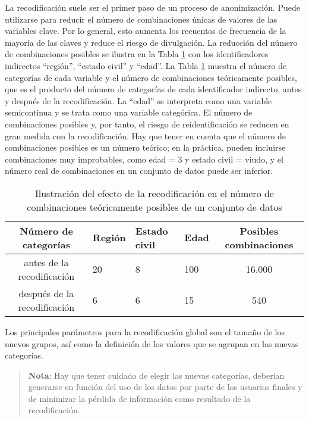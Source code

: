 \documentclass[
]{book}
\theoremstyle{definition}
\theoremstyle{definition}
\theoremstyle{definition}
\theoremstyle{definition}
\theoremstyle{remark}
\begin{document}
La recodificación suele ser el primer paso de un proceso de anonimización. Puede utilizarse para reducir el número de combinaciones únicas de valores de las variables clave. Por lo general, esto aumenta los recuentos de frecuencia de la mayoría de las claves y reduce el riesgo de divulgación. La reducción del número de combinaciones posibles se ilustra en la Tabla \ref{tab:Tabla8} con los identificadores indirectos ``región'', ``estado civil'' y ``edad''. La Tabla \ref{tab:Tabla8} muestra el número de categorías de cada variable y el número de combinaciones teóricamente posibles, que es el producto del número de categorías de cada identificador indirecto, antes y después de la recodificación. La ``edad'' se interpreta como una variable semicontinua y se trata como una variable categórica. El número de combinaciones posibles y, por tanto, el riesgo de reidentificación se reducen en gran medida con la recodificación. Hay que tener en cuenta que el número de combinaciones posibles es un número teórico; en la práctica, pueden incluirse combinaciones muy improbables, como edad = 3 y estado civil = viudo, y el número real de combinaciones en un conjunto de datos puede ser inferior.

\begin{table}

\caption{\label{tab:Tabla8}\label{tab:Tabla8}Ilustración del efecto de la recodificación en el número de combinaciones teóricamente posibles de un conjunto de datos}
\centering
\begin{tabular}[t]{clllc}
\toprule
Número de   categorías & Región & Estado civil & Edad & Posibles   combinaciones\\
\midrule
antes de la recodificación & 20 & 8 & 100 & 16.000\\
después de la recodificación & 6 & 6 & 15 & 540\\
\bottomrule
\end{tabular}
\end{table}

Los principales parámetros para la recodificación global son el tamaño de los nuevos grupos, así como la definición de los valores que se agrupan en las nuevas categorías.

\begin{quote}
\textbf{Nota}: Hay que tener cuidado de elegir las nuevas categorías, deberían generarse en función del uso de los datos por parte de los usuarios finales y de minimizar la pérdida de información como resultado de la recodificación.
\end{quote}
\end{document}
